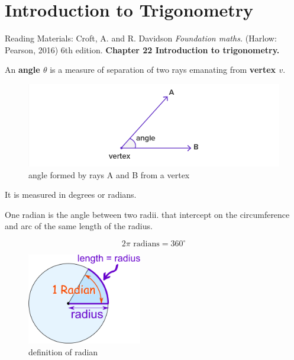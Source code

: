 \chapter{Introduction to Trigonometry}
Reading Materials: \newline
Croft, A. and R. Davidson \textit{Foundation maths.} (Harlow: Pearson, 2016) 6th edition. \textbf{Chapter 22 Introduction to trigonometry.}

\vspace{5mm}

\noindent An \textbf{angle $\theta$} is a measure of separation of two rays emanating from \textbf{vertex $v$}.

\begin{figure}[htp]
	\centering
	\includegraphics[width=\linewidth]{Assets/angles}
	\caption{angle formed by rays A and B from a vertex}
	\label{fig:angles}
\end{figure}

\noindent It is measured in degrees or radians.

\vspace{5mm}

\noindent One radian is the angle between two radii. that intercept on the circumference and arc of the same length of the radius.

\begin{equation}
	2 \pi \text{ radians} = 360^{\circ}
\end{equation}

\begin{figure}[htp]
	\centering
	\includegraphics[width=50mm]{Assets/radian-circle}
	\caption{definition of radian}
	\label{fig:radian}
\end{figure}
\newpage
